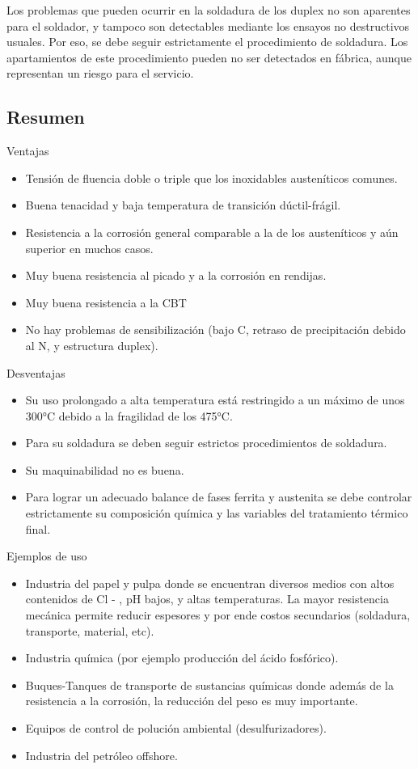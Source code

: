 Los problemas que pueden ocurrir en la soldadura de los duplex no son aparentes para el soldador, y tampoco son detectables mediante los ensayos no destructivos usuales. Por eso, se debe seguir estrictamente el procedimiento de soldadura. Los apartamientos de este procedimiento pueden no ser detectados en fábrica, aunque representan un riesgo para el servicio.

\subsection{Resumen}
Ventajas
\begin{itemize}
	\item Tensión de fluencia doble o triple que los inoxidables austeníticos comunes.
	\item Buena tenacidad y baja temperatura de transición dúctil-frágil.
	\item Resistencia a la corrosión general comparable a la de los austeníticos y aún superior en muchos casos.
	\item Muy buena resistencia al picado y a la corrosión en rendijas.
	\item Muy buena resistencia a la CBT
	\item No hay problemas de sensibilización (bajo C, retraso de precipitación debido al N, y estructura duplex).
\end{itemize}

Desventajas
\begin{itemize}
	\item Su uso prolongado a alta temperatura está restringido a un máximo de unos 300°C debido a la fragilidad de los 475°C.
	\item Para su soldadura se deben seguir estrictos procedimientos de soldadura.
	\item Su maquinabilidad no es buena.
	\item Para lograr un adecuado balance de fases ferrita y austenita se debe controlar estrictamente su composición química y las variables del tratamiento térmico final.
\end{itemize}

Ejemplos de uso
\begin{itemize}
	\item Industria del papel y pulpa donde se encuentran diversos medios con altos contenidos de Cl - , pH bajos, y altas temperaturas. La mayor resistencia mecánica permite reducir espesores y por ende costos secundarios (soldadura, transporte, material, etc).
	\item Industria química (por ejemplo producción del ácido fosfórico).
	\item Buques-Tanques de transporte de sustancias químicas donde además de la resistencia a la corrosión, la reducción del peso es muy importante.
	\item Equipos de control de polución ambiental (desulfurizadores).
	\item Industria del petróleo offshore.
\end{itemize}







